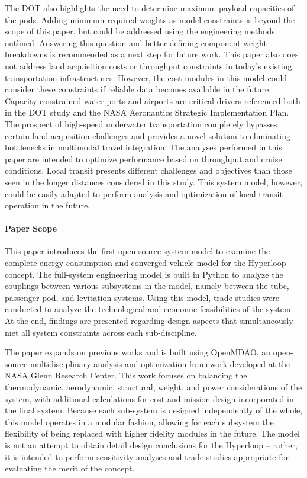 	The DOT also highlights the need to determine maximum payload capacities
	of the pods. Adding minimum required weights as model constraints is beyond the scope of
	this paper, but could be addressed using the engineering methods outlined.
	Answering this question and better defining component weight breakdowns
	is recommended as a next step for future work.
	This paper also does not address land acquisition costs or throughput
	constraints in today's existing transportation infrastructures.
	However, the cost modules in this model could consider these constraints if
	reliable data becomes available in the future.
	Capacity constrained water ports and airports are critical drivers referenced
	both in the DOT study and the NASA Aeronautics Strategic
	Implementation Plan. The prospect of high-speed underwater transportation
	completely bypasses certain land acquisition challenges and provides a novel solution
	to eliminating bottlenecks in multimodal travel integration. The analyses performed in this paper
	are intended to optimize performance based on throughput and cruise conditions.
	Local transit presents different challenges and objectives than those seen in the longer distances
	considered in this study. This system model, however, could be easily adapted to perform
	analysis and optimization of local transit operation in the future.\\

\paragraph{Paper Scope}
	This paper introduces the first open-source system model to examine the
	complete energy consumption and converged vehicle model for the Hyperloop concept.
	The full-system engineering model is built in Python to analyze the couplings
	between various subsystems in the model, namely between the tube, passenger pod, and
	levitation systems. Using this model, trade studies were conducted to analyze the technological
	and economic feasibilities of the system.
	At the end, findings are presented regarding design aspects that simultaneously
	met all system constraints across each sub-discipline.

	The paper expands on previous works \cite{Chin}
	and is built using OpenMDAO, an open-source multidisciplinary analysis and
	optimization framework developed at the NASA Glenn Research Center.
	This work focuses on balancing the thermodynamic, aerodynamic, structural,
	weight, and power considerations of the system, with additional calculations for cost
	and mission design incorporated in the final system. Because each sub-system
	is designed independently of the whole, this model operates in a modular fashion, allowing
	for each subsystem the flexibility of being replaced with higher fidelity modules in the future.
	The model is not an attempt to obtain detail design conclusions for the Hyperloop
	-- rather, it is intended to perform sensitivity analyses
	and trade studies appropriate for evaluating the merit of the concept.

